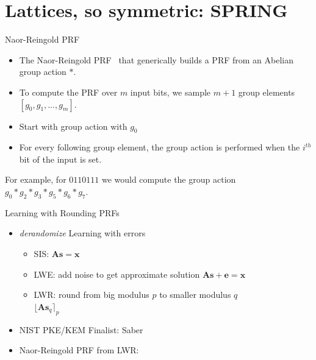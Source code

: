 \documentclass[10pt]{beamer}
\newcommand{\bv}[1]{\mathbf{#1}}
\begin{document}
\section{Lattices, so symmetric: SPRING }
\begin{frame}{Naor-Reingold PRF~\cite{NaoRei04}}
  \begin{itemize}
    \item The Naor-Reingold PRF~\cite{NaoRei04} that generically builds a PRF
      from an Abelian group action $*$.\pause
    \item
      To compute the PRF over $m$ input bits, we sample $m+1$ group elements $[g_0,
      g_1, \ldots, g_m]$. \pause
    \item Start with group action with $g_0$\pause
    \item For every following
      group element, the group action is performed when the $i^{th}$ bit of the input is set. \pause
  \end{itemize}
  \begin{example}
    For example, for $0110111$ we would
    compute the group action $g_0*g_2*g_3*g_5*g_6*g_7$.
  \end{example}
\end{frame}

\begin{frame}{Learning with Rounding PRFs}
  \begin{itemize}
    \item \emph{derandomize} Learning with errors \pause
      \begin{itemize}
        \item SIS: $\bv{As}=\bv{x}$
        \item LWE: add noise to get approximate solution $\bv{As}+\bv{e}=\bv{x}$
        \item LWR: round from big modulus $p$ to smaller modulus $q$\\ 
          $\lfloor\bv{As}_q\rceil_p$\pause
      \end{itemize}
    \item NIST PKE/KEM Finalist: Saber~\cite{NISTPQC-R3:SABER20}\pause
    \item Naor-Reingold PRF from LWR: 
  \end{itemize}
  \onslide<1->{
    \begin{align*}
      \mathcal{F}_{\bv{K}}(c_1,
      \cdots,c_m)=S\left(\bv{k}_0 \prod_{i=1}^m \bv{k}_{i}^{c_i}\right)
    \end{align*}
  }


\end{frame}
\end{document}
